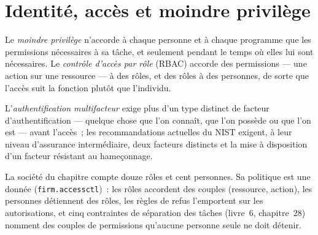 \section{Identité, accès et moindre privilège}

\begin{definition}\label{def:pl:security:rbac}
Le \emph{moindre privilège} n'accorde à chaque personne et à chaque programme que les permissions nécessaires à sa tâche, et seulement pendant
le temps où elles lui sont nécessaires. Le \emph{contrôle d'accès par rôle} (RBAC) accorde des permissions --- une action sur une ressource --- à des rôles, et des rôles
à des personnes, de sorte que l'accès suit la fonction plutôt que l'individu.
\end{definition}

\begin{definition}\label{def:pl:security:mfa}
L'\emph{authentification multifacteur} exige plus d'un type distinct de facteur d'authentification --- quelque chose que l'on connaît, que l'on possède
ou que l'on est --- avant l'accès~; les recommandations actuelles du NIST exigent, à leur niveau d'assurance intermédiaire, deux facteurs distincts et la
mise à disposition d'un facteur résistant au hameçonnage.
\end{definition}

La société du chapitre compte douze rôles et cent personnes. Sa politique est une donnée (\texttt{firm.accessctl})~: les rôles accordent des couples (ressource, action), les personnes
détiennent des rôles, les règles de refus l'emportent sur les autorisations, et cinq contraintes de séparation des tâches (livre~6, chapitre~28) nomment des couples de
permissions qu'aucune personne seule ne doit détenir.

\label{lst:pl:security:sod}

\label{lst:pl:security:policy}

